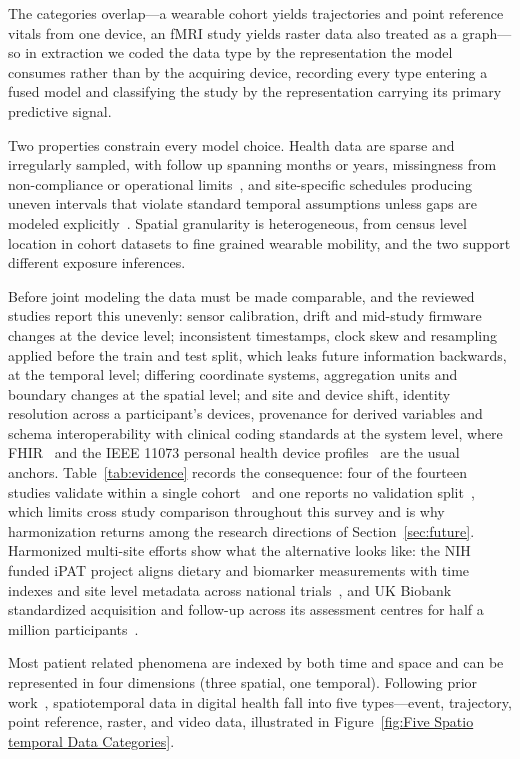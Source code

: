\documentclass[journal]{IEEEtran}
\newif\ifsubmission
\begin{document}
The categories overlap---a wearable cohort yields trajectories and point reference vitals from one device, an fMRI study yields raster data also treated as a graph---so in extraction we coded the data type by the representation the model consumes rather than by the acquiring device, recording every type entering a fused model and classifying the study by the representation carrying its primary predictive signal.

Two properties constrain every model choice. Health data are sparse and irregularly sampled, with follow up spanning months or years, missingness from non-compliance or operational limits~\cite{che2018grud}, and site-specific schedules producing uneven intervals that violate standard temporal assumptions unless gaps are modeled explicitly~\cite{shukla2021irregular}. Spatial granularity is heterogeneous, from census level location in cohort datasets to fine grained wearable mobility, and the two support different exposure inferences.

Before joint modeling the data must be made comparable, and the reviewed studies report this unevenly: sensor calibration, drift and mid-study firmware changes at the device level; inconsistent timestamps, clock skew and resampling applied before the train and test split, which leaks future information backwards, at the temporal level; differing coordinate systems, aggregation units and boundary changes at the spatial level; and site and device shift, identity resolution across a participant's devices, provenance for derived variables and schema interoperability with clinical coding standards at the system level, where FHIR~\cite{ayaz2021fhir} and the IEEE 11073 personal health device profiles~\cite{ieee11073std} are the usual anchors. Table~\ref{tab:evidence} records the consequence: four of the fourteen studies validate within a single cohort~\cite{2,9,Lim2025VirtualCGM,glaser2022deep} and one reports no validation split~\cite{XiaoLi2016DiabetesSpatiotemporal}, which limits cross study comparison throughout this survey and is why harmonization returns among the research directions of Section~\ref{sec:future}. Harmonized multi-site efforts show what the alternative looks like: the NIH funded iPAT project aligns dietary and biomarker measurements with time indexes and site level metadata across national trials~\cite{Fang2021iPAT}, and UK Biobank standardized acquisition and follow-up across its assessment centres for half a million participants~\cite{sudlow2015ukbiobank}.
\else

Most patient related phenomena are indexed by both time and space and can be represented in four dimensions (three spatial, one temporal). Following prior work~\cite{wang2022deep,atluri2018stdm}, spatiotemporal data in digital health fall into five types---event, trajectory, point reference, raster, and video data\ifsubmission\else , illustrated in Figure~\ref{fig:Five Spatio temporal Data Categories}\fi .
\end{document}
